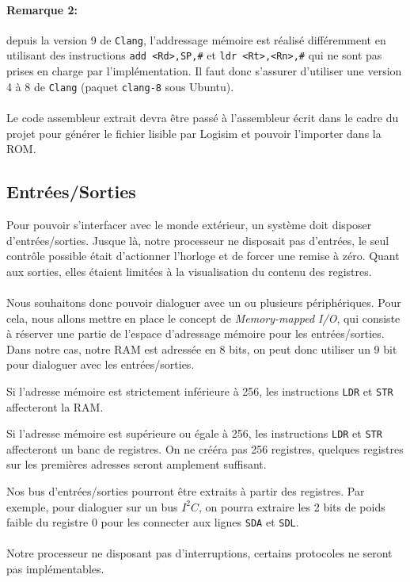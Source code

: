 \paragraph{Remarque 2:} depuis la version 9 de \texttt{Clang}, l'addressage mémoire est réalisé différemment en utilisant des instructions \texttt{add <Rd>,SP,\#<imm8>} et \texttt{ldr <Rt>,<Rn>,\#<imm5>} qui ne sont pas prises en charge par l'implémentation. Il faut donc s'assurer d'utiliser une version 4 à 8 de \texttt{Clang} (paquet \texttt{clang-8} sous Ubuntu).

\paragraph{}
Le code assembleur extrait devra être passé à l'assembleur écrit dans le cadre du projet pour générer le fichier lisible par Logisim et pouvoir l'importer dans la ROM.


\subsection{Entrées/Sorties}

Pour pouvoir s'interfacer avec le monde extérieur, un système doit disposer d'entrées/sorties.
Jusque là, notre processeur ne disposait pas d'entrées, le seul contrôle possible était d'actionner l'horloge et de forcer une remise à zéro.
Quant aux sorties, elles étaient limitées à la visualisation du contenu des registres.

\paragraph{}
Nous souhaitons donc pouvoir dialoguer avec un ou plusieurs périphériques.
Pour cela, nous allons mettre en place le concept de \textit{Memory-mapped I/O}, qui consiste à réserver une partie de l'espace d'adressage mémoire pour les entrées/sorties.
Dans notre cas, notre RAM est adressée en 8 bits, on peut donc utiliser un 9\ieme {} bit pour dialoguer avec les entrées/sorties.

Si l'adresse mémoire est strictement inférieure à 256, les instructions \texttt{LDR} et \texttt{STR} affecteront la RAM.

Si l'adresse mémoire est supérieure ou égale à 256, les instructions \texttt{LDR} et \texttt{STR} affecteront un banc de registres.
On ne crééra pas 256 registres, quelques registres sur les premières adresses seront amplement suffisant.

Nos bus d'entrées/sorties pourront être extraits à partir des registres.
Par exemple, pour dialoguer sur un bus $I^2C$, on pourra extraire les 2 bits de poids faible du registre 0 pour les connecter aux lignes \texttt{SDA} et \texttt{SDL}.

\paragraph{}
Notre processeur ne disposant pas d'interruptions, certains protocoles ne seront pas implémentables.
